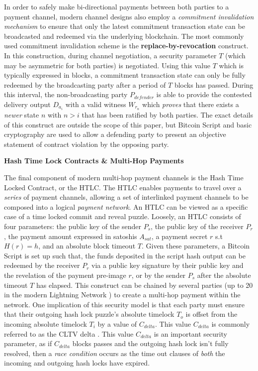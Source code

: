 \documentclass[10pt,a4paper]{article}
\theoremstyle{definition}
\begin{document}
In order to safely make bi-directional payments between both parties to a
payment channel, modern channel designs also employ a \emph{commitment
invalidation mechanism} \cite{chanSok} to ensure that only the latest
commitment transaction state can be broadcasted and redeemed via the underlying
blockchain. The most commonly used commitment invalidation scheme is the
\textbf{replace-by-revocation} construct. In this construction, during channel
negotiation, a security parameter $T$ (which may be asymmetric for both
parties) is negotiated. Using this value $T$ which is typically expressed in
blocks, a commitment transaction state can only be fully redeemed by the
broadcasting party after a period of $T$ blocks has passed. During this
interval, the non-broadcasting party $P_{defender}$ is able to provide the
contested delivery output $D_{a_i}$ with a valid witness $W_{r_n}$ which
\emph{proves} that there exists a  \emph{newer} state $n$ with $n > i$ that has
been ratified by both parties. The exact details of this construct are outside
the scope of this paper, but Bitcoin Script and basic cryptography are used to
allow a defending party to present an objective statement of contract violation
by the opposing party. \\

\begin{center}
\textbf{Hash Time Lock Contracts \& Multi-Hop Payments}
\end{center}

The final component of modern multi-hop payment channels is the Hash Time
Locked Contract, or the HTLC. The HTLC enables payments to travel over a
\emph{series} of payment channels, allowing a set of interlinked payment
channels to be composed into a logical \emph{payment network}. An HTLC can be
viewed as a specific case of a time locked commit and reveal puzzle.  Loosely,
an HTLC consists of four parameters: the public key of the sender $P_{s}$, the
public key of the receiver $P_{r}$, the payment amount expressed in satoshis
$A_{sat}$, a payment secret $r$ s.t $H(r) = h$, and an absolute block timeout
$T$. Given these parameters, a Bitcoin Script is set up such that, the funds
deposited in the script hash output can be redeemed by the receiver $P_{r}$ via
a public key signature by their public key and the revelation of the payment
pre-image $r$, or by the sender $P_{s}$ after the absolute timeout $T$ has
elapsed. This construct can be chained by several parties (up to 20 in the
modern Lightning Network \cite{bolt4}) to create a multi-hop payment within the
network. One implication of this security model is that each party must ensure
that their outgoing hash lock puzzle's absolute timelock $T_o$ is offset from
the incoming absolute timelock $T_i$ by a value of $C_{delta}$. This value
$C_{delta}$ is commonly referred to as the CLTV delta \cite{bolt7}. This value
$C_{delta}$ is an important security parameter, as if $C_{delta}$ blocks passes
and the outgoing hash lock isn't fully resolved, then a \emph{race condition}
occurs as the time out clauses of \emph{both} the incoming and outgoing hash
locks have expired. \\
\end{document}
